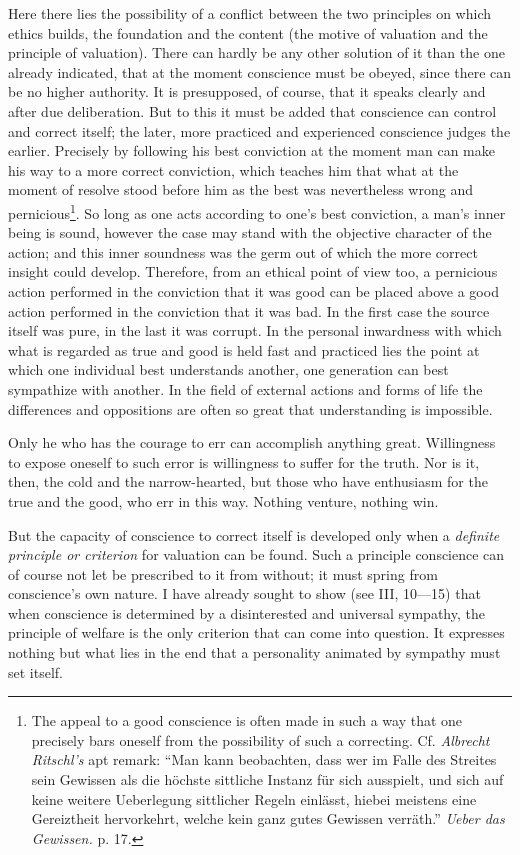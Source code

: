 \documentclass[12pt,a4paper,openany]{book}
\newcommand{\opage}[1]{\marginnote{\footnotesize\textit{[#1]}}}
\begin{document}
Here there lies the possibility of a conflict between the two principles on which ethics builds, the
foundation and the content (the motive of valuation and the principle of valuation). There can hardly be
any other solution of it than the one already indicated, that at the moment conscience must be obeyed,
since there can be no higher authority. It is presupposed, of course, that it speaks clearly and after
due deliberation. But to this it must be added that conscience can control and correct itself; the
later, more
\opage{95}practiced and experienced conscience judges the earlier. Precisely by following his best conviction at
the moment man can make his way to a more correct conviction, which teaches him that what at the moment
of resolve stood before him as the best was nevertheless wrong and pernicious\footnote[1]{The appeal to a
good conscience is often made in such a way that one precisely bars oneself from the possibility of such
a correcting. Cf. \emph{Albrecht Ritschl's} apt remark: ``Man kann beobachten, dass wer im Falle des
Streites sein Gewissen als die höchste sittliche Instanz für sich ausspielt, und sich auf keine weitere
Ueberlegung sittlicher Regeln einlässt, hiebei meistens eine Gereiztheit hervorkehrt, welche kein ganz
gutes Gewissen verräth.'' \textit{Ueber das Gewissen.} p. 17.}. So long as one acts according to one's
best conviction, a man's inner being is sound, however the case may stand with the objective character of
the action; and this inner soundness was the germ out of which the more correct insight could develop.
Therefore, from an ethical point of view too, a pernicious action performed in the conviction that it was
good can be placed above a good action performed in the conviction that it was bad. In the first case the
source itself was pure, in the last it was corrupt. In the personal inwardness with which what is
regarded as true and good is held fast and practiced lies the point at which one individual best
understands another, one generation can best sympathize with another. In the field of external actions
and forms of life the differences and oppositions are often so great that understanding is impossible.

Only he who has the courage to err can accomplish anything great. Willingness to expose oneself to such
error is willingness to suffer for the truth. Nor is it, then, the cold and the narrow-hearted, but those
who have enthusiasm for the true and the good, who err in this way. Nothing venture, nothing win.

But the capacity of conscience to correct itself is developed only when a \textit{definite principle or
criterion} for valuation can be found. Such a principle conscience can of course not let be prescribed to
it from without; it must spring from conscience's own nature. I have already sought to show (see
\opage{96}III, 10---15) that when conscience is determined by a disinterested and universal sympathy, the
principle of welfare is the only criterion that can come into question. It expresses nothing but what
lies in the end that a personality animated by sympathy must set itself.
\end{document}
